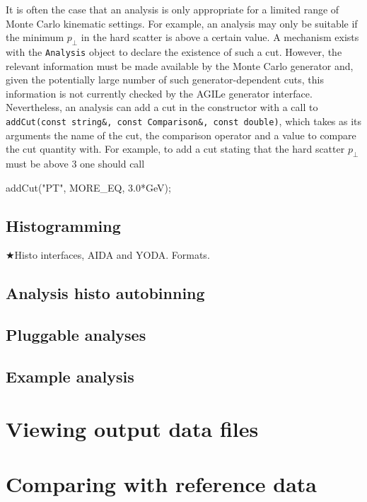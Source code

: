 \documentclass{JHEP3}
\DeclareRobustCommand{\TODO}[1]{\ensuremath{\bigstar}{#1}\xspace}
\newenvironment{snippet}{\Verbatim}{\endVerbatim}
\newcommand{\code}[1]{\texttt{#1}\xspace}
\newcommand{\pT}{\ensuremath{p_\perp}\xspace}
\begin{document}
It is often the case that an analysis is only appropriate for a limited range of
Monte Carlo kinematic settings.  For example, an analysis may only be suitable
if the minimum \pT in the hard scatter is above a certain value.  A mechanism
exists with the \code{Analysis} object to declare the existence of such a cut.
However, the relevant information must be made available by the Monte Carlo
generator and, given the potentially large number of such generator-dependent
cuts, this information is not currently checked by the AGILe generator
interface.  Nevertheless, an analysis can add a cut in the constructor with a
call to \code{addCut(const string\&, const Comparison\&, const double)}, which
takes as its arguments the name of the cut, the comparison operator and a value
to compare the cut quantity with.  For example, to add a cut stating that the
hard scatter \pT must be above \unit{3}{\GeV} one should call

\begin{snippet}
  addCut("PT", MORE_EQ, 3.0*GeV);
\end{snippet}



\subsection{Histogramming}
\TODO{Histo interfaces, AIDA and YODA. Formats.}

\subsection{Analysis histo autobinning}
\subsection{Pluggable analyses}
\subsection{Example analysis}

\section{Viewing output data files}

\section{Comparing with reference data}


\end{document}
